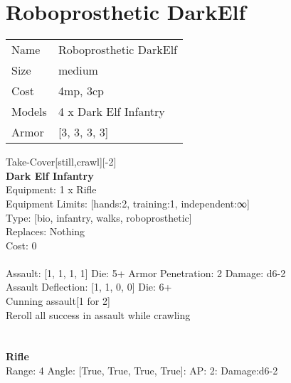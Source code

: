 \pagebreak\pagebreak

\section{ Roboprosthetic DarkElf }

\begin{tabular}{ll}
  Name & Roboprosthetic DarkElf \\
  Size & medium\\
  Cost & 4mp, 3cp\\
  Models & 4 x Dark Elf Infantry\\
  Armor & [3, 3, 3, 3]\\
\end{tabular}

\noindent Take-Cover[still,crawl][-2]\\ 


{\bf Dark Elf Infantry } \\
Equipment: 1 x Rifle \\
Equipment Limits: [hands:2, training:1, independent:∞] \\
Type: [bio, infantry, walks, roboprosthetic] \\
Replaces: Nothing \\
Cost: 0\\
\ \\
Assault: [1, 1, 1, 1] Die: 5+ Armor Penetration: 2 Damage: d6-2 \\
Assault Deflection: [1, 1, 0, 0] Die: 6+\\
\indent Cunning assault[1 for 2]\\ 
Reroll all success in assault while crawling\\ 
 
\ \\

\ \\
{\bf Rifle } \\



Range: 4  Angle: [True, True, True, True]: AP: 2: Damage:d6-2 \\




 
\ \\



